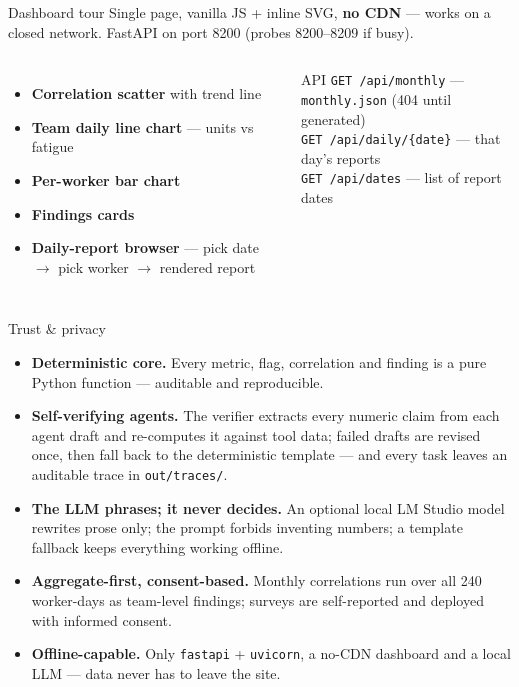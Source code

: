 \documentclass[aspectratio=169]{beamer}
\begin{document}
\begin{frame}{Dashboard tour}
  Single page, vanilla JS + inline SVG, \textbf{no CDN} --- works on a closed
  network. FastAPI on port 8200 (probes 8200--8209 if busy).
  \vspace{1ex}
  \begin{columns}[T]
    \begin{itemize}
      \item \textbf{Correlation scatter} with trend line
      \item \textbf{Team daily line chart} --- units vs fatigue
      \item \textbf{Per-worker bar chart}
      \item \textbf{Findings cards}
      \item \textbf{Daily-report browser} --- pick date $\rightarrow$ pick
            worker $\rightarrow$ rendered report
    \end{itemize}
    \begin{block}{API}
      \small
      \texttt{GET /api/monthly} --- \texttt{monthly.json} (404 until generated)\\[2pt]
      \texttt{GET /api/daily/\{date\}} --- that day's reports\\[2pt]
      \texttt{GET /api/dates} --- list of report dates
    \end{block}
  \end{columns}
\end{frame}

\begin{frame}{Trust \& privacy}
  \begin{itemize}
    \item \textbf{Deterministic core.} Every metric, flag, correlation and
          finding is a pure Python function --- auditable and reproducible.
    \item \textbf{Self-verifying agents.} The verifier extracts every numeric
          claim from each agent draft and re-computes it against tool data;
          failed drafts are revised once, then fall back to the deterministic
          template --- and every task leaves an auditable trace in
          \texttt{out/traces/}.
    \item \textbf{The LLM phrases; it never decides.} An optional local LM
          Studio model rewrites prose only; the prompt forbids inventing
          numbers; a template fallback keeps everything working offline.
    \item \textbf{Aggregate-first, consent-based.} Monthly correlations run
          over all 240 worker-days as team-level findings; surveys are
          self-reported and deployed with informed consent.
    \item \textbf{Offline-capable.} Only \texttt{fastapi} + \texttt{uvicorn},
          a no-CDN dashboard and a local LLM --- data never has to leave the site.
  \end{itemize}
\end{frame}
\end{document}
